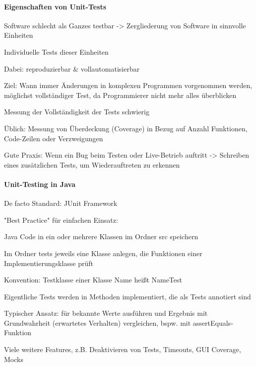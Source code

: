 \documentclass[10pt]{article}
\begin{document}
\paragraph{Eigenschaften von Unit-Tests}
\begin{itemize*}
  \item Software schlecht als Ganzes testbar -> Zergliederung von Software in sinnvolle Einheiten
  \item Individuelle Tests dieser Einheiten
  \item Dabei: reproduzierbar \& vollautomatisierbar
  \begin{itemize*}
    \item Ziel: Wann immer Änderungen in komplexen Programmen vorgenommen werden, möglichst vollständiger Test, da Programmierer nicht mehr alles überblicken
  \end{itemize*}
  \item Messung der Vollständigkeit der Tests schwierig
  \item Üblich: Messung von Überdeckung (Coverage) in Bezug auf Anzahl Funktionen, Code-Zeilen oder Verzweigungen
  \item Gute Praxis: Wenn ein Bug beim Testen oder Live-Betrieb auftritt -> Schreiben eines zusätzlichen Tests, um Wiederauftreten zu erkennen
\end{itemize*}

\paragraph{Unit-Testing in Java}
\begin{itemize*}
  \item De facto Standard: JUnit Framework
  \item "Best Practice" für einfachen Einsatz:
  \begin{itemize*}
    \item Java Code in ein oder mehrere Klassen im Ordner src speichern
    \item Im Ordner tests jeweils eine Klasse anlegen, die Funktionen einer Implementierungsklasse prüft
    \item Konvention: Testklasse einer Klasse Name heißt NameTest
    \item Eigentliche Tests werden in Methoden implementiert, die als Tests annotiert sind
    \item Typischer Ansatz: für bekannte Werte ausführen und Ergebnis mit Grundwahrheit (erwartetes Verhalten) vergleichen, bspw. mit assertEquals-Funktion
  \end{itemize*}
  \item Viele weitere Features, z.B. Deaktivieren von Tests, Timeouts, GUI Coverage, Mocks
\end{itemize*}
\end{document}
